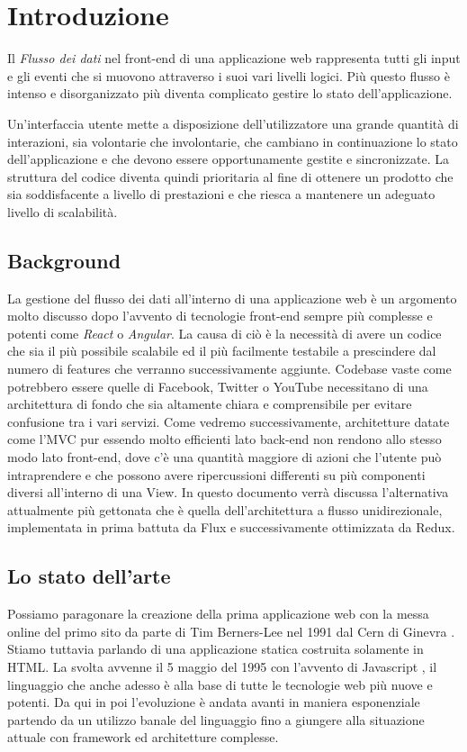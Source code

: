 \chapter{Introduzione}
Il \textit{Flusso dei dati} nel front-end di una applicazione web rappresenta tutti gli input e gli eventi che si muovono attraverso i suoi vari livelli logici. Più questo flusso è intenso e disorganizzato più diventa complicato gestire lo stato dell'applicazione.

Un'interfaccia utente mette a disposizione dell'utilizzatore una grande quantità di interazioni, sia volontarie che involontarie, che cambiano in continuazione lo stato dell'applicazione e che devono essere opportunamente gestite e sincronizzate. La struttura del codice diventa quindi prioritaria al fine di ottenere un prodotto che sia soddisfacente a livello di prestazioni e che riesca a mantenere un adeguato livello di scalabilità.

\section{Background}
La gestione del flusso dei dati all'interno di una applicazione web è un argomento molto discusso dopo l'avvento di tecnologie front-end sempre più complesse e potenti come \textit{React} o \textit{Angular}. La causa di ciò è la necessità di avere un codice che sia il più possibile scalabile ed il più facilmente testabile a prescindere dal numero di features che verranno successivamente aggiunte. 
Codebase vaste come potrebbero essere quelle di Facebook, Twitter o YouTube necessitano di una architettura di fondo che sia altamente chiara e comprensibile per evitare confusione tra i vari servizi.
Come vedremo successivamente, architetture datate come l'MVC pur essendo molto efficienti lato back-end non rendono allo stesso modo lato front-end, dove c'è una quantità maggiore di azioni che l'utente può intraprendere e che possono avere ripercussioni differenti su più componenti diversi all'interno di una View.
In questo documento verrà discussa l'alternativa attualmente più gettonata che è quella dell'architettura a flusso unidirezionale, implementata in prima battuta da Flux e successivamente ottimizzata da Redux.

\section{Lo stato dell'arte}
Possiamo paragonare la creazione della prima applicazione web con la messa online del primo sito da parte di Tim Berners-Lee nel 1991 dal Cern di Ginevra \cite{HuffingtonpostFirstWebsite}. Stiamo tuttavia parlando di una applicazione statica costruita solamente in HTML. La svolta avvenne il 5 maggio del 1995 con l'avvento di Javascript \cite{W3cJavascriptHistory}, il linguaggio che anche adesso è alla base di tutte le tecnologie web più nuove e potenti. Da qui in poi l'evoluzione è andata avanti in maniera esponenziale partendo da un utilizzo banale del linguaggio fino a giungere alla situazione attuale con framework ed architetture complesse.

